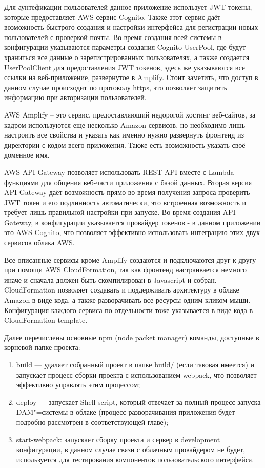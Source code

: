Для аунтефикации пользователей данное приложение использует JWT токены, которые предоставляет AWS сервис Cognito. Также этот сервис даёт возможность быстрого создания и настройки интерфейса для регистрации новых пользователей с проверкой почты. Во время создания всей системы в конфигурации указываются параметры создания Cognito UserPool, где будут храниться все данные о зарегистрированных пользователях, а также создается UserPoolClient для предоставления JWT токенов, здесь же указываются все ссылки на веб-приложение, развернутое в Amplify. Стоит заметить, что доступ в данном случае происходит по протоколу https, это позволяет защитить информацию при авторизации пользователей.

AWS Amplify – это сервис, предоставляющий недорогой хостинг веб-сайтов, за кадром используются еще несколько Amazon сервисов, но необходимо лишь настроить все свойства и указать как именно нужно развернуть фронтенд из директории с кодом всего приложения. Также есть возможность указать своё доменное имя.

AWS API Gateway позволяет использовать REST API вместе с Lambda функциями для общения веб-части приложения с базой данных. Вторая версия API Gateway даёт возможность прямо во время получения запроса проверить JWT токен и его подлинность автоматически, это встроенная возможность и требует лишь правильной настройки при запуске. Во время создания API Gateway, в конфигурации указывается провайдер токенов - в данном приложении это AWS Cognito, что позволяет эффективно использовать интеграцию этих двух сервисов облака AWS. 

Все описанные сервисы кроме Amplify создаются и подключаются друг к другу при помощи AWS CloudFormation, так как фронтенд настраивается немного иначе и сначала должен быть скомпилирован в Javascript и собран. CloudFormation позволяет создавать и поддерживать архитектуру в облаке Amazon в виде кода, а также разворачивать все ресурсы одним кликом мыши. Конфигурация каждого сервиса по отдельности тоже указывается в виде кода в CloudFormation template.

Далее перечислены основные npm (node packet manager) команды, доступные в корневой папке проекта:
\begin{enumerate}
\item build --- удаляет собранный проект в папке build/ (если таковая имеется) и запускает процесс сборки проекта с использованием webpack, что позволяет эффективно управлять этим процессом;
\item deploy --- запускает Shell script, который отвечает за полный процесс запуска DAM"=системы в облаке (процесс разворачивания приложения будет подробно рассмотрен в соответствующей главе);
\item start-webpack: запускает сборку проекта и сервер в development конфигурации, в данном случае связи с облачным провайдером не будет, используется для тестирования компонентов пользовательского интерфейса.
\end{enumerate}

